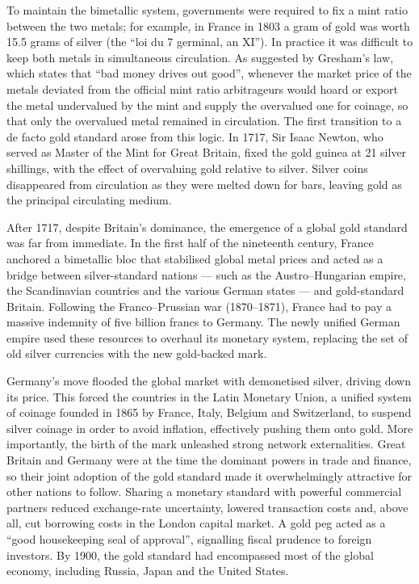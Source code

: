 To maintain the bimetallic system, governments were required to fix a mint ratio between the two metals; for example, in France in 1803 a gram of gold was worth 15.5 grams of silver (the ``loi du 7 germinal, an XI''). In practice it was difficult to keep both metals in simultaneous circulation. As suggested by Gresham's law, which states that ``bad money drives out good'', whenever the market price of the metals deviated from the official mint ratio arbitrageurs would hoard or export the metal undervalued by the mint and supply the overvalued one for coinage, so that only the overvalued metal remained in circulation. The first transition to a de facto gold standard arose from this logic. In 1717, Sir Isaac Newton, who served as Master of the Mint for Great Britain, fixed the gold guinea at 21 silver shillings, with the effect of overvaluing gold relative to silver. Silver coins disappeared from circulation as they were melted down for bars, leaving gold as the principal circulating medium.
 
After 1717, despite Britain's dominance, the emergence of a global gold standard was far from immediate. In the first half of the nineteenth century, France anchored a bimetallic bloc that stabilised global metal prices and acted as a bridge between silver-standard nations --- such as the Austro–Hungarian empire, the Scandinavian countries and the various German states --- and gold-standard Britain. Following the Franco–Prussian war (1870–1871), France had to pay a massive indemnity of five billion francs to Germany. The newly unified German empire used these resources to overhaul its monetary system, replacing the set of old silver currencies with the new gold-backed mark.
 
Germany's move flooded the global market with demonetised silver, driving down its price. This forced the countries in the Latin Monetary Union, a unified system of coinage founded in 1865 by France, Italy, Belgium and Switzerland, to suspend silver coinage in order to avoid inflation, effectively pushing them onto gold. More importantly, the birth of the mark unleashed strong network externalities. Great Britain and Germany were at the time the dominant powers in trade and finance, so their joint adoption of the gold standard made it overwhelmingly attractive for other nations to follow. Sharing a monetary standard with powerful commercial partners reduced exchange-rate uncertainty, lowered transaction costs and, above all, cut borrowing costs in the London capital market. A gold peg acted as a ``good housekeeping seal of approval'', signalling fiscal prudence to foreign investors. By 1900, the gold standard had encompassed most of the global economy, including Russia, Japan and the United States.
